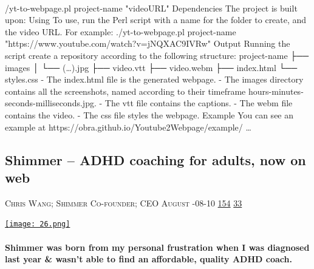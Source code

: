 \documentclass[10pt,a4paper]{article}
\begin{document}
\begin{multicols}{2}
\paragraph{}
/yt-to-webpage.pl project-name "videoURL"
Dependencies
The project is built upon:
Using
To use, run the Perl script with a name for the folder to create, and the video URL. For example:
./yt-to-webpage.pl project-name "https://www.youtube.com/watch?v=jNQXAC9IVRw"
Output
Running the script create a repository according to the following structure:
project-name ├── images │ └── (…).jpg ├── video.vtt ├── video.webm ├── index.html └── styles.css
- The index.html file is the generated webpage.
- The images directory contains all the screenshots, named according to their timeframe
hours-minutes-seconds-milliseconds.jpg.
- The vtt file contains the captions.
- The webm file contains the video.
- The css file styles the webpage.
Example
You can see an example at https://obra.github.io/Youtube2Webpage/example/
\dots\par
\noindent\begin{minipage}{\linewidth}
\medskip
\subsection{Shimmer – ADHD coaching for adults, now on web}
\textsc{\footnotesize
{\scriptsize\faUser}\space 
Chris Wang; Shimmer Co-founder; CEO August 
{\scriptsize\faCalendar}-08-10 
{\scriptsize\faThumbsOUp}\space 
\href{http://news.ycombinator.com/item?id=37252231\&utm\_term=comment}{154} 
{\scriptsize\faComments}\space 
\href{http://news.ycombinator.com/item?id=37252231\&utm\_term=comment}{33} 
}
\par\medskip\noindent
\href{https://www.shimmer.care/blog/web-launch-adhd-coaching?utm\_source=hackernewsletter\&utm\_medium=email\&utm\_term=show\_hn}{
    \texttt{[image: 26.png]}
}
\end{minipage}
\paragraph{}
\textbf{Shimmer was born from my personal frustration when I was diagnosed last year \& wasn’t able to find an affordable, quality ADHD coach.}

\end{multicols}
\end{document}
